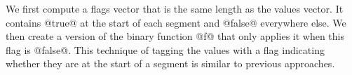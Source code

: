 We first compute a flags vector that is the same length as the values vector. It contains @true@ at the start of each segment and @false@ everywhere else. We then create a version of the binary function @f@ that only applies it when this flag is @false@. This technique of tagging the values with a flag indicating whether they are at the start of a segment is similar to previous approaches\citep{Blelloch:1990vl}.












